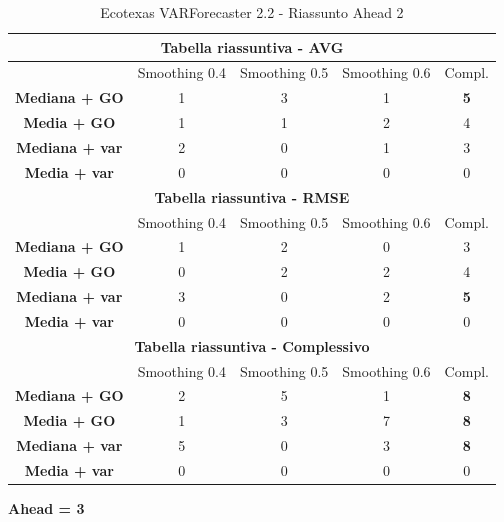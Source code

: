 \documentclass[12pt,a4paper,oneside,openright]{book}
\begin{document}
\begin{table}[H]
\centering
\begin{tabular}{|c|c|c|c|c|}
\hline
\multicolumn{5}{|c|}{\textbf{Tabella riassuntiva - AVG}} \\
\hline
& Smoothing 0.4 & Smoothing 0.5 & Smoothing 0.6 & Compl.\\
\hline
\textbf{Mediana + GO} & 1 & 3 & 1 & \textbf{5}\\ 
\hline
\textbf{Media + GO} & 1 & 1 & 2 & 4\\ 
\hline
\textbf{Mediana + var} & 2 & 0 & 1 & 3\\ 
\hline
\textbf{Media + var} & 0 & 0 & 0 & 0\\ 
\hline
\multicolumn{5}{|c|}{\textbf{Tabella riassuntiva - RMSE}} \\
\hline
& Smoothing 0.4 & Smoothing 0.5 & Smoothing 0.6 & Compl.\\
\hline
\textbf{Mediana + GO} & 1 & 2 & 0 & 3\\ 
\hline
\textbf{Media + GO} & 0 & 2 & 2 & 4\\ 
\hline
\textbf{Mediana + var} & 3 & 0 & 2 & \textbf{5}\\ 
\hline
\textbf{Media + var} & 0 & 0 & 0 & 0\\ 
\hline
\multicolumn{5}{|c|}{\textbf{Tabella riassuntiva - Complessivo}} \\
\hline
& Smoothing 0.4 & Smoothing 0.5 & Smoothing 0.6 & Compl.\\
\hline
\textbf{Mediana + GO} & 2 & 5 & 1 & \textbf{8}\\ 
\hline
\textbf{Media + GO} & 1 & 3 & 7 & \textbf{8}\\ 
\hline
\textbf{Mediana + var} & 5 & 0 & 3 & \textbf{8}\\ 
\hline
\textbf{Media + var} & 0 & 0 & 0 & 0\\ 
\hline
\end{tabular}
\caption{Ecotexas VARForecaster 2.2 - Riassunto Ahead 2}
\end{table}

\newpage

\textbf{Ahead = 3}

\medskip
\end{document}
